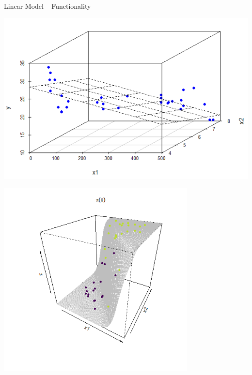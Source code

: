 \documentclass[11pt,compress,t,notes=noshow, xcolor=table]{beamer}
\begin{document}
\begin{frame}{Linear Model -- Functionality}
\medskip
\footnotesize

\begin{minipage}{0.32\textwidth}
  \includegraphics[width=1.2\textwidth]{figure/linreg-surface.png}
\end{minipage}
 \normalsize 
\begin{minipage}{0.42\textwidth}
  \begin{center}
  \includegraphics[width=0.75\textwidth]{figure/logreg-2vars-surface.png}
  \end{center}
\end{minipage}
\begin{minipage}{0.22\textwidth}

\end{minipage}
\end{frame}
\end{document}
